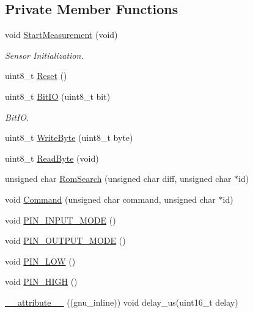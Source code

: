 \subsection*{Private Member Functions}
\begin{DoxyCompactItemize}
\item 
void \hyperlink{classDS18B20_a817183f6ef9552d6559d58d714e5c804}{Start\+Measurement} (void)
\begin{DoxyCompactList}\small\item\em Sensor Initialization. \end{DoxyCompactList}\item 
uint8\+\_\+t \hyperlink{classDS18B20_a890b94747fbd3ec6e45088735c7bc1fe}{Reset} ()
\item 
uint8\+\_\+t \hyperlink{classDS18B20_ac2bf79674d18e4ad00d7b41d76d411e3}{Bit\+IO} (uint8\+\_\+t bit)
\begin{DoxyCompactList}\small\item\em Bit\+IO. \end{DoxyCompactList}\item 
uint8\+\_\+t \hyperlink{classDS18B20_a7314cb6a438ddd0c214ed409f7dd5d86}{Write\+Byte} (uint8\+\_\+t byte)
\item 
uint8\+\_\+t \hyperlink{classDS18B20_aa43d0c42ebb25bbdc9b7904710652c75}{Read\+Byte} (void)
\item 
unsigned char \hyperlink{classDS18B20_a356e88e8a6bca4f5ffeb41180c08f91d}{Rom\+Search} (unsigned char diff, unsigned char $\ast$id)
\item 
void \hyperlink{classDS18B20_a1f03dae7ea2d07a225343eaa33d119cf}{Command} (unsigned char command, unsigned char $\ast$id)
\item 
void \hyperlink{classDS18B20_abd68014bd97396c4b0365d3e1ca1f61c}{P\+I\+N\+\_\+\+I\+N\+P\+U\+T\+\_\+\+M\+O\+DE} ()
\item 
void \hyperlink{classDS18B20_aaa611dcdffd8f02719f62c8a93c0c7c0}{P\+I\+N\+\_\+\+O\+U\+T\+P\+U\+T\+\_\+\+M\+O\+DE} ()
\item 
void \hyperlink{classDS18B20_a8a8a45bbfe229978ea7280177b6fe18b}{P\+I\+N\+\_\+\+L\+OW} ()
\item 
void \hyperlink{classDS18B20_af9d029958b4a835a15867df7ad59d7d3}{P\+I\+N\+\_\+\+H\+I\+GH} ()
\item 
\hyperlink{classDS18B20_a458a891af1a3631958fa84c5b5bbc457}{\+\_\+\+\_\+attribute\+\_\+\+\_\+} ((gnu\+\_\+inline)) void delay\+\_\+us(uint16\+\_\+t delay)
\end{DoxyCompactItemize}
